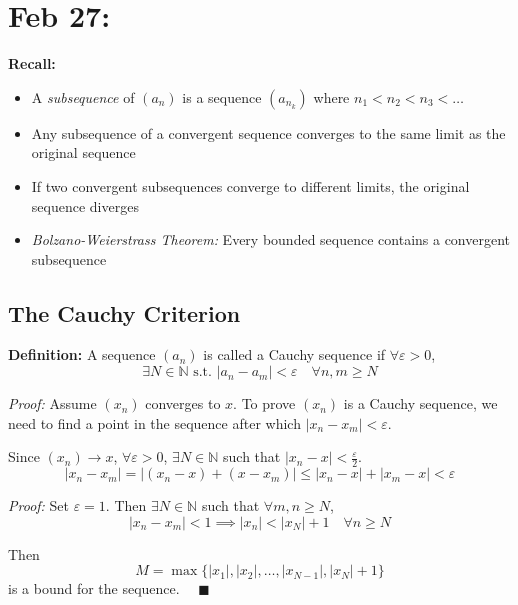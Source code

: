 \documentclass[12pt]{report}
\newcommand{\N}{\mathbb{N}}
\newcommand{\qed}{\quad \blacksquare}
\newcommand{\abs}[1]{\left\vert #1 \right\vert}
\newcommand{\st}{\text{ s.t. }}
\newcommand{\ep}{\varepsilon}
\newenvironment*{tbox}[2][gray]{
    \begin{tcolorbox}[
        parbox=false,
        colback=#1!5!white,
        colframe=#1!75!black,
        breakable,
        title={#2}
    ]}
    {\end{tcolorbox}}
\begin{document}
\section{Feb 27:}
    \textbf{Recall:}
    \begin{itemize}
        \item A \emph{subsequence} of $(a_n)$ is a sequence $(a_{n_k})$ where $n_1 < n_2 < n_3 < \dots$
        \item Any subsequence of a convergent sequence converges to the same limit as the original sequence
        \item If two convergent subsequences converge to different limits, the original sequence diverges 
        \item \emph{Bolzano-Weierstrass Theorem:} Every bounded sequence contains a convergent subsequence
    \end{itemize}

    \subsection*{The Cauchy Criterion}
        \textbf{Definition:} A sequence $(a_n)$ is called a Cauchy sequence if $\forall \ep > 0$, 
        \[\exists N \in \N \st \abs{a_n - a_m} < \ep \quad \forall n, m \geq N\]

        \begin{tbox}{\textbf{Theorem:} Every convergent sequence is a Cauchy sequence}
            \emph{Proof:} Assume $(x_n)$ converges to $x$. To prove $(x_n)$ is a Cauchy sequence, we need to find a point in the sequence after which $\abs{x_n - x_m} < \ep$. 
            
            Since $(x_n) \to x$, $\forall \ep> 0$, $\exists N \in \N$ such that $\abs{x_n - x} < \frac{\ep}{2}$. 
            \[\abs{x_n - x_m} = \abs{(x_n - x) + (x - x_m)} \leq \abs{x_n - x} + \abs{x_m - x} < \ep\]
        \end{tbox}

        \begin{tbox}{\textbf{Lemma:} Cauchy sequences are bounded}
            \emph{Proof:} Set $\ep = 1$. Then $\exists N \in \N$ such that $\forall m, n \geq N$,
            \[\abs{x_n - x_m} < 1 \implies \abs{x_n} < \abs{x_N} + 1 \quad \forall n \geq N\]

            Then 
            \[M = \max\{\abs{x_1}, \abs{x_2}, \dots, \abs{x_{N-1}}, \abs{x_N} + 1\}\]
            is a bound for the sequence. $\qed$
        \end{tbox}
\end{document}
